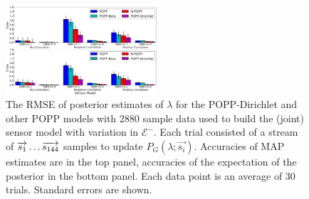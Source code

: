 \begin{figure}[t!]
	\centering
	\includegraphics[width=0.5\textwidth]{./figures/tjnr_comparison_2880.png}
    \caption{The RMSE of posterior estimates of $\lambda$ for the POPP-Dirichlet and other POPP models with 2880 sample data used to build the (joint) sensor model with variation in $\mathcal{E^-}$. Each trial consisted of a stream of $\protect\overrightarrow{s_1} \ldots \protect\overrightarrow{s_{144}}$ samples to update $P_G(\lambda ; \overrightarrow{s_i})$. Accuracies of MAP estimates are in the top panel, accuracies of the expectation of the posterior in the bottom panel. Each data point is an average of 30 trials. Standard errors are shown.} 
	\label{fig:tjnr_comparison_2880}
\end{figure}
